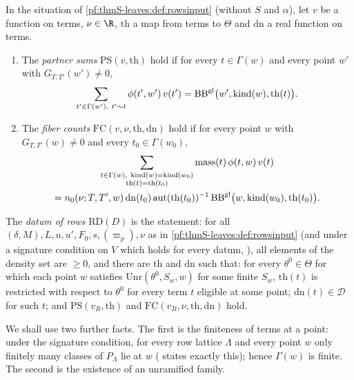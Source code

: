 \begin{definition}\label{pf:thmS-leaves:def:rowsdatum}
In the situation of \cref{pf:thmS-leaves:def:rowsinput} (without $S$ and $\alpha$), let $v$ be a function on terms,
$\nu\in\R$, $\mathrm{th}$ a map from terms to $\Theta$ and $\mathrm{dn}$ a real function on terms.
\begin{enumerate}
\item The \emph{partner sums} $\mathrm{PS}(v,\mathrm{th})$ hold if for every $t\in\Gamma(w)$ and every point $w'$ with
$G_{T,T'}(w')\ne0$,
\begin{equation}\label{pf:thmS-leaves:eq:PS}
\sum_{t'\in\Gamma(w'),\ t'\sim t}\phi(t',w')\,v(t')=\mathrm{BB}^{\mathrm{gl}}\bigl(w',\mathrm{kind}(w),\mathrm{th}(t)\bigr).
\end{equation}
\item The \emph{fiber counts} $\mathrm{FC}(v,\nu,\mathrm{th},\mathrm{dn})$ hold if for every point $w$ with
$G_{T,T'}(w)\ne0$ and every $t_0\in\Gamma(w_0)$,
\begin{multline}\label{pf:thmS-leaves:eq:FC}
\sum_{\substack{t\in\Gamma(w),\ \mathrm{kind}(w)=\mathrm{kind}(w_0)\\ \mathrm{th}(t)=\mathrm{th}(t_0)}}\mathrm{mass}(t)\,\phi(t,w)\,v(t)\\
=n_0(\nu;T,T',w)\,\mathrm{dn}(t_0)\,\mathrm{aut}(\mathrm{th}(t_0))^{-1}\,\mathrm{BB}^{\mathrm{gl}}\bigl(w,\mathrm{kind}(w_0),\mathrm{th}(t_0)\bigr).
\end{multline}
\end{enumerate}
The \emph{datum of rows} $\mathrm{RD}(D)$ is the statement: for all $(\delta,M),L,u,u',F_0,s,(\varpi_p),\nu$ as in
\cref{pf:thmS-leaves:def:rowsinput} (and under a signature condition on $V$ which holds for every datum,
), all elements of the density set are $\ge0$, and there are $\mathrm{th}$ and
$\mathrm{dn}$ such that: for every $\theta^0\in\Theta$ for which each point $w$ satisfies $\mathrm{Unr}(\theta^0,S_w,w)$ for some
finite $S_w$, $\mathrm{th}(t)$ is restricted with respect to $\theta^0$ for every term $t$ eligible at some point;
$\mathrm{dn}(t)\in\mathcal D$ for such $t$; and $\mathrm{PS}(v_R,\mathrm{th})$ and $\mathrm{FC}(v_R,\nu,\mathrm{th},\mathrm{dn})$ hold.
\end{definition}

We shall use two further facts. The first is the finiteness of terms at a point: under the signature condition, for
every row lattice $\Lambda$ and every point $w$ only finitely many classes of $P_\Lambda$ lie at $w$
( states exactly this); hence $\Gamma(w)$ is finite. The second is the existence of an
unramified family.

